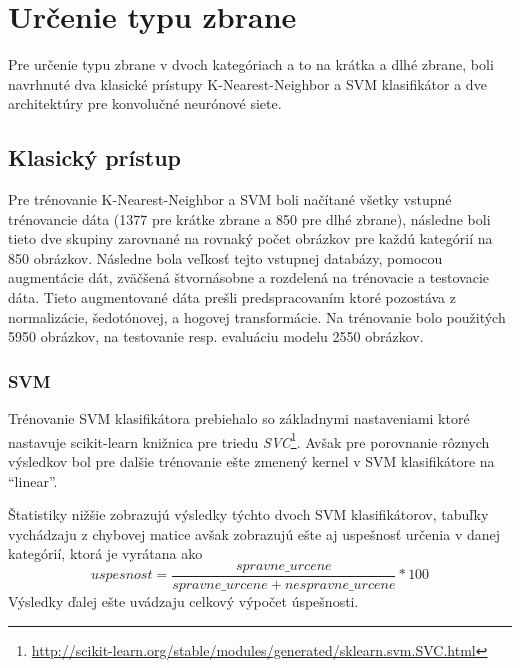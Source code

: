 
\section{Určenie typu zbrane}
Pre určenie typu zbrane v dvoch kategóriach a to na krátka a dlhé zbrane, boli navrhnuté dva klasické prístupy
    K-Nearest-Neighbor a SVM klasifikátor a dve architektúry pre konvolučné neurónové siete.

\subsection{Klasický prístup}
Pre trénovanie K-Nearest-Neighbor a SVM boli načítané všetky vstupné trénovancie dáta (1377 pre krátke zbrane a 850 pre dlhé zbrane),
    následne boli tieto dve skupiny zarovnané na rovnaký počet obrázkov pre každú kategórií na 850 obrázkov.
Následne bola veľkosť tejto vstupnej databázy, pomocou augmentácie dát, zväčšená štvornásobne a rozdelená na trénovacie a testovacie dáta.
Tieto augmentované dáta prešli predspracovaním ktoré pozostáva z normalizácie, šedotónovej, a hogovej transformácie.
Na trénovanie bolo použitých 5950 obrázkov, na testovanie resp. evaluáciu modelu 2550 obrázkov.

\subsubsection{SVM}
Trénovanie SVM klasifikátora prebiehalo so základnymi nastaveniami ktoré nastavuje scikit-learn knižnica pre triedu \textit{SVC}\footnote{\url{http://scikit-learn.org/stable/modules/generated/sklearn.svm.SVC.html}}.
Avšak pre porovnanie rôznych výsledkov bol pre dalšie trénovanie ešte zmenený kernel v SVM klasifikátore na ``linear''.

Štatistiky nižšie zobrazujú výsledky týchto dvoch SVM klasifikátorov, tabuľky vychádzaju z chybovej matice avšak
    zobrazujú ešte aj uspešnosť určenia v danej kategórií, ktorá je vyrátana ako
    $$uspesnost = \frac{spravne\_urcene}{spravne\_urcene + nespravne\_urcene} * 100$$
Výsledky ďalej ešte uvádzaju celkový výpočet úspešnosti.

